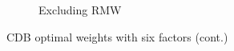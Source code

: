 \begin{figure}[htbp]
\begin{subfigure}{0.45\textwidth}
    \caption{Excluding RMW}
  \end{subfigure}
  \footnotesize
  \caption{CDB optimal weights with six factors (cont.)}
\end{figure}

